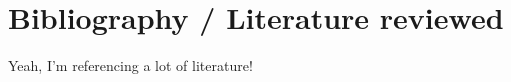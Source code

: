 \chapter{Bibliography / Literature reviewed}
\label{chap:bibliography}
Yeah, I'm referencing a lot of literature!
\cite{schuld_evaluating_2019,mitarai_quantum_2018,wendenius_gradient-free_2023}
\printbibliography
